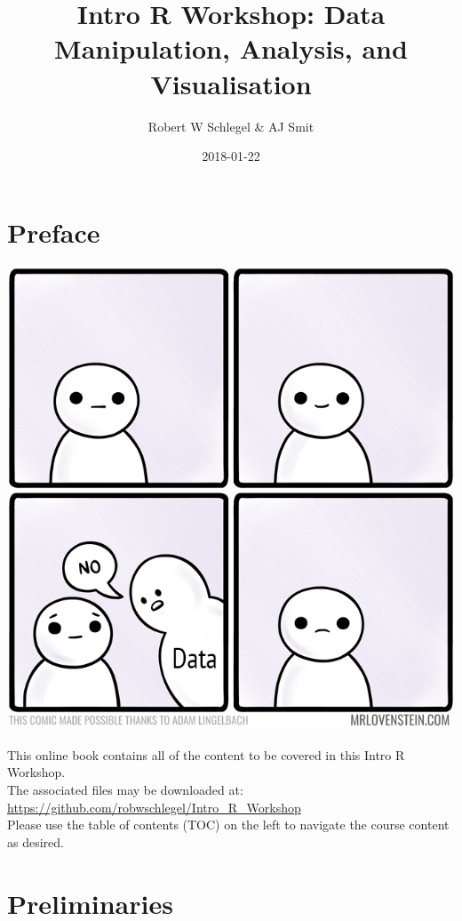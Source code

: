 \documentclass[]{book}
\title{Intro R Workshop: Data Manipulation, Analysis, and Visualisation}
\author{Robert W Schlegel \& AJ Smit}
\date{2018-01-22}
\theoremstyle{definition}
\theoremstyle{definition}
\theoremstyle{definition}
\theoremstyle{remark}
\begin{document}
\maketitle

{
\setcounter{tocdepth}{1}
\tableofcontents
}
\chapter*{Preface}\label{preface}

\begin{center}\includegraphics[width=1\linewidth]{figures/769_life_finds_a_way} \end{center}

This online book contains all of the content to be covered in this Intro
R Workshop.\\
The associated files may be downloaded at:
\url{https://github.com/robwschlegel/Intro_R_Workshop}\\
Please use the table of contents (TOC) on the left to navigate the
course content as desired.

\chapter{Preliminaries}\label{prelim}
\end{document}
